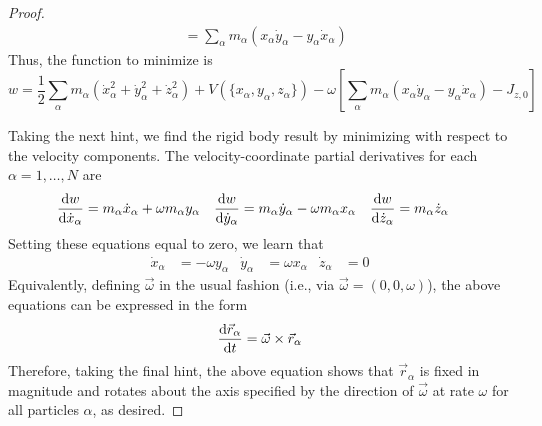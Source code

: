 \documentclass[../psets.tex]{subfiles}
\begin{document}
\begin{enumerate}
\begin{proof}
\begin{align*}
            &= \sum_\alpha m_\alpha(x_\alpha\dot{y}_\alpha-y_\alpha\dot{x}_\alpha)
        \end{align*}
        Thus, the function to minimize is
        \begin{equation*}
            w = \frac{1}{2}\sum_\alpha m_\alpha(\dot{x}_\alpha^2+\dot{y}_\alpha^2+\dot{z}_\alpha^2)+V(\{x_\alpha,y_\alpha,z_\alpha\})-\omega\left[ \sum_\alpha m_\alpha(x_\alpha\dot{y}_\alpha-y_\alpha\dot{x}_\alpha)-J_{z,0} \right]
        \end{equation*}\par
        Taking the next hint, we find the rigid body result by minimizing with respect to the velocity components. The velocity-coordinate partial derivatives for each $\alpha=1,\dots,N$ are
        \begin{align*}
            \dv{w}{\dot{x}_\alpha} &= m_\alpha\dot{x}_\alpha+\omega m_\alpha y_\alpha&
            \dv{w}{\dot{y}_\alpha} &= m_\alpha\dot{y}_\alpha-\omega m_\alpha x_\alpha&
            \dv{w}{\dot{z}_\alpha} &= m_\alpha\dot{z}_\alpha
        \end{align*}
        Setting these equations equal to zero, we learn that
        \begin{align*}
            \dot{x}_\alpha &= -\omega y_\alpha&
            \dot{y}_\alpha &= \omega x_\alpha&
            \dot{z}_\alpha &= 0
        \end{align*}
        Equivalently, defining $\vec{\omega}$ in the usual fashion (i.e., via $\vec{\omega}=(0,0,\omega)$), the above equations can be expressed in the form
        \begin{equation*}
            \dv{\vec{r}_\alpha}{t} = \vec{\omega}\times\vec{r}_\alpha
        \end{equation*}
        Therefore, taking the final hint, the above equation shows that $\vec{r}_\alpha$ is fixed in magnitude and rotates about the axis specified by the direction of $\vec{\omega}$ at rate $\omega$ for all particles $\alpha$, as desired.
    \end{proof}

\end{enumerate}
\end{document}
